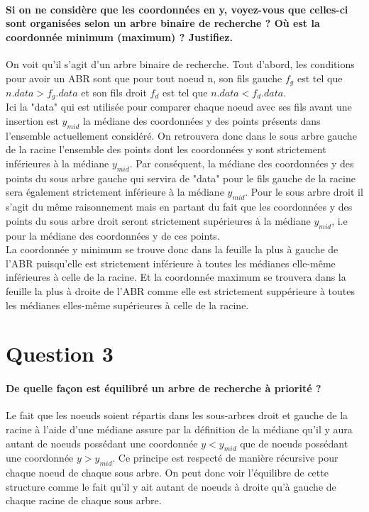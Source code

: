 \documentclass{article}
\begin{document}
    \paragraph{Si on ne considère que les coordonnées en y, voyez-vous que celles-ci sont organisées selon
    un arbre binaire de recherche ? Où est la coordonnée minimum (maximum) ? Justifiez.}
    On voit qu'il s'agit d'un arbre binaire de recherche. Tout d'abord, les conditions pour avoir un ABR sont que pour tout noeud n, son fils gauche $f_g$ est 
    tel que $n.data > f_g.data$ et son fils droit $f_d$ est tel que $n.data < f_d.data$. \\
    Ici la "data" qui est utilisée pour comparer chaque noeud avec ses fils avant une insertion est $y_{mid}$ la médiane des coordonnées y des points
    présents dans l'ensemble actuellement considéré. On retrouvera donc dans le sous arbre gauche de la racine l'ensemble des points dont les coordonnées
    y sont strictement inférieures à la médiane $y_{mid}$. Par conséquent, la médiane des coordonnées y des points du sous arbre gauche qui servira
    de "data" pour le fils gauche de la racine sera également strictement inférieure à la médiane $y_{mid}$. Pour le sous arbre droit il s'agit du même raisonnement
    mais en partant du fait que les coordonnées y des points du sous arbre droit seront strictement supérieures à la médiane $y_{mid}$, i.e pour la médiane des coordonnées
    y de ces points. \\
    La coordonnée y minimum se trouve donc dans la feuille la plus à gauche de l'ABR puisqu'elle est strictement inférieure à toutes les médianes elle-même inférieures
    à celle de la racine. Et la coordonnée maximum se trouvera dans la feuille la plus à droite de l'ABR comme elle est strictement suppérieure à toutes
    les médianes elles-même supérieures à celle de la racine.

\newpage
\section{Question 3}
    \paragraph{De quelle façon est équilibré un arbre de recherche à priorité ?}
    Le fait que les noeuds soient répartis dans les sous-arbres droit et gauche de la racine à l'aide d'une médiane assure par la définition de
    la médiane qu'il y aura autant de noeuds possédant une coordonnée $y < y_{mid}$ que de noeuds possédant une coordonnée $y > y_{mid}$.
    Ce principe est respecté de manière récursive pour chaque noeud de chaque sous arbre. On peut donc voir l'équilibre de cette structure comme le fait
    qu'il y ait autant de noeuds à droite qu'à gauche de chaque racine de chaque sous arbre.
\end{document}
